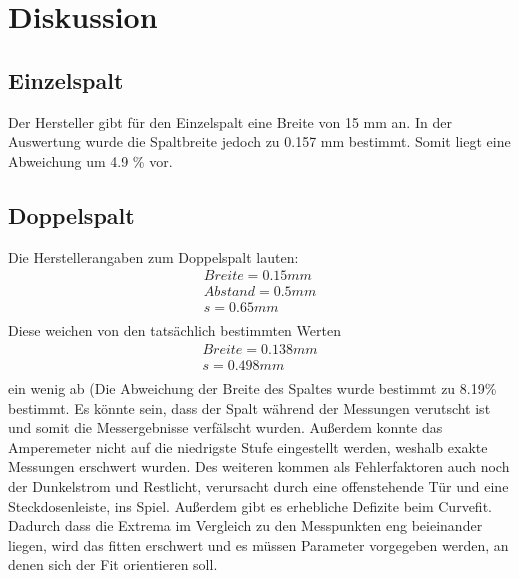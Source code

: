 \section{Diskussion}
\label{sec:Diskussion}

\subsection{Einzelspalt}
    Der Hersteller gibt für den Einzelspalt eine Breite von 15 mm an. In der Auswertung wurde 
    die Spaltbreite jedoch zu 0.157 mm bestimmt. Somit liegt eine Abweichung um 4.9 \% vor.
    
\subsection{Doppelspalt}
    Die Herstellerangaben zum Doppelspalt lauten:
    \begin{align*}
        Breite = 0.15 mm\\
        Abstand = 0.5 mm\\
        s = 0.65 mm\\
    \end{align*}
    Diese weichen von den tatsächlich bestimmten Werten 
    \begin{align*}
        Breite = 0.138 mm\\
        s = 0.498 mm\\
    \end{align*}
    ein wenig ab (Die Abweichung der Breite des Spaltes wurde bestimmt zu 8.19\% bestimmt.
    Es könnte sein, dass 
    der Spalt während der Messungen verutscht ist und somit die Messergebnisse verfälscht wurden.
    Außerdem konnte das Amperemeter nicht auf die niedrigste Stufe eingestellt werden, weshalb
    exakte Messungen erschwert wurden. Des weiteren kommen als Fehlerfaktoren auch noch der 
    Dunkelstrom und Restlicht, verursacht durch eine offenstehende Tür und eine Steckdosenleiste, 
    ins Spiel.
    Außerdem gibt es erhebliche Defizite beim Curvefit. Dadurch dass die Extrema im Vergleich zu den 
    Messpunkten eng beieinander liegen, wird das fitten erschwert und es müssen Parameter vorgegeben 
    werden, an denen sich der Fit orientieren soll.

